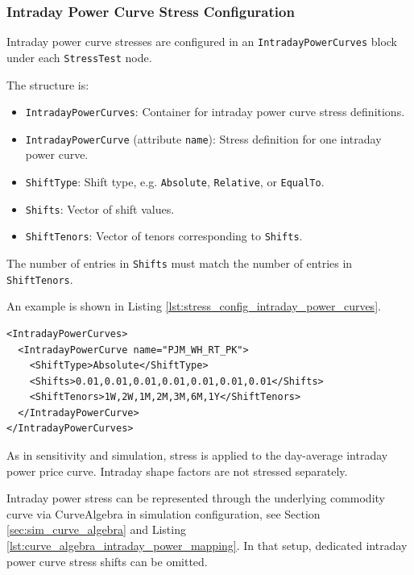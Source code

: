 \subsubsection{Intraday Power Curve Stress Configuration}

Intraday power curve stresses are configured in an \lstinline!IntradayPowerCurves! block under each
\lstinline!StressTest! node.

The structure is:
\begin{itemize}
\item \lstinline!IntradayPowerCurves!: Container for intraday power curve stress definitions.
\item \lstinline!IntradayPowerCurve! (attribute \lstinline!name!): Stress definition for one intraday power curve.
\item \lstinline!ShiftType!: Shift type, e.g. \lstinline!Absolute!, \lstinline!Relative!, or \lstinline!EqualTo!.
\item \lstinline!Shifts!: Vector of shift values.
\item \lstinline!ShiftTenors!: Vector of tenors corresponding to \lstinline!Shifts!.
\end{itemize}

The number of entries in \lstinline!Shifts! must match the number of entries in \lstinline!ShiftTenors!.

An example is shown in Listing \ref{lst:stress_config_intraday_power_curves}.

\begin{listing}[H]
\begin{verbatim}
<IntradayPowerCurves>
  <IntradayPowerCurve name="PJM_WH_RT_PK">
    <ShiftType>Absolute</ShiftType>
    <Shifts>0.01,0.01,0.01,0.01,0.01,0.01,0.01</Shifts>
    <ShiftTenors>1W,2W,1M,2M,3M,6M,1Y</ShiftTenors>
  </IntradayPowerCurve>
</IntradayPowerCurves>
\end{verbatim}
\caption{Intraday power curve stress configuration}
\label{lst:stress_config_intraday_power_curves}
\end{listing}

As in sensitivity and simulation, stress is applied to the day-average intraday power price curve. Intraday shape
factors are not stressed separately.

Intraday power stress can be represented through the underlying commodity
curve via CurveAlgebra in simulation configuration, see Section \ref{sec:sim_curve_algebra} and Listing
\ref{lst:curve_algebra_intraday_power_mapping}. In that setup, dedicated intraday power curve stress shifts can be
omitted.
